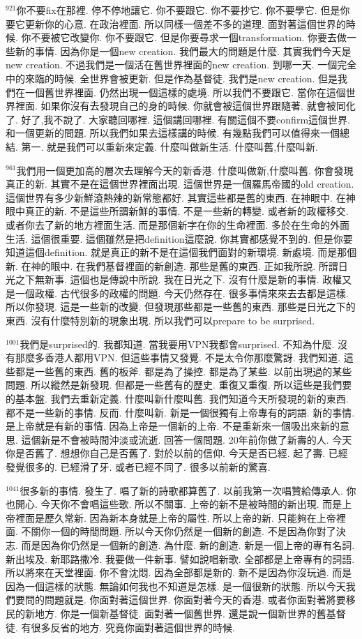 \documentclass{book}
\begin{document}
$^{921}$你不要fix在那裡.
停不停地讓它.
你不要跟它.
你不要抄它.
你不要學它.
但是你要它更新你的心意.
在政治裡面.
所以同樣一個差不多的道理.
面對著這個世界的時候.
你不要被它改變你.
你不要跟它.
但是你要尋求一個transformation.
你要去做一些新的事情.
因為你是一個new creation.
我們最大的問題是什麼.
其實我們今天是new creation.
不過我們是一個活在舊世界裡面的new creation.
到哪一天.
一個完全中的來臨的時候.
全世界會被更新.
但是作為基督徒.
我們是new creation.
但是我們在一個舊世界裡面.
仍然出現一個這樣的處境.
所以我們不要跟它.
當你在這個世界裡面.
如果你沒有去發現自己的身的時候.
你就會被這個世界跟隨著.
就會被同化了.
好了,我不說了.
大家聽回哪裡.
這個講回哪裡.
有關這個不要confirm這個世界.
和一個更新的問題.
所以我們如果去這樣講的時候.
有幾點我們可以值得來一個總結.
第一.
就是我們可以重新來定義.
什麼叫做新生活.
什麼叫舊,什麼叫新.

$^{961}$我們用一個更加高的層次去理解今天的新香港.
什麼叫做新,什麼叫舊.
你會發現真正的新.
其實不是在這個世界裡面出現.
這個世界是一個羅馬帝國的old creation.
這個世界有多少新鮮滾熱辣的新常態都好.
其實這些都是舊的東西.
在神眼中.
在神眼中真正的新.
不是這些所謂新鮮的事情.
不是一些新的轉變.
或者新的政權移交.
或者你去了新的地方裡面生活.
而是那個新字在你的生命裡面.
多於在生命的外面生活.
這個很重要.
這個雖然是把definition這麼說.
你其實都感覺不到的.
但是你要知道這個definition.
就是真正的新不是在這個我們面對的新環境.
新處境.
而是那個新.
在神的眼中.
在我們基督裡面的新創造.
那些是舊的東西.
正如我所說.
所謂日光之下無新事.
這個也是傳說中所說.
我在日光之下.
沒有什麼是新的事情.
政權又是一個政權.
古代很多的政權的問題.
今天仍然存在.
很多事情來來去去都是這樣.
所以你發現.
這是一些新的改變.
但發現那些都是一些舊的東西.
那些是日光之下的東西.
沒有什麼特別新的現象出現.
所以我們可以prepare to be surprised.

$^{1001}$我們是surprised的.
我都知道.
當我要用VPN我都會surprised.
不知為什麼.
沒有那麼多香港人都用VPN.
但這些事情又發覺.
不是太令你那麼驚訝.
我們知道.
這些都是一些舊的東西.
舊的板斧.
都是為了操控.
都是為了某些.
以前出現過的某些問題.
所以縱然是新發現.
但都是一些舊有的歷史.
重復又重復.
所以這些是我們要的基本盤.
我們去重新定義.
什麼叫新什麼叫舊.
我們知道今天所發現的新的東西.
都不是一些新的事情.
反而.
什麼叫新.
新是一個很獨有上帝專有的詞語.
新的事情.
是上帝就是有新的事情.
因為上帝是一個新的上帝.
不是重新來一個吸出來新的意思.
這個新是不會被時間沖淡或流逝.
回答一個問題.
20年前你做了新壽的人.
今天你是否舊了.
想想你自己是否舊了.
對於以前的信仰.
今天是否已經.
起了壽.
已經發覺很多的.
已經滑了牙.
或者已經不同了.
很多以前新的驚喜.

$^{1041}$很多新的事情.
發生了.
唱了新的詩歌都算舊了.
以前我第一次唱贊給傳承人.
你也開心.
今天你不會唱這些歌.
所以不關事.
上帝的新不是被時間的新出現.
而是上帝裡面是歷久常新.
因為新本身就是上帝的屬性.
所以上帝的新.
只能夠在上帝裡面.
不關你一個的時間問題.
所以今天你仍然是一個新的創造.
不是因為你對了決志.
而是因為你仍然是一個新的創造.
為什麼.
新的創造.
新是一個上帝的專有名詞.
新出埃及.
新耶路撒冷.
我要做一件新事.
譬如說唱新歌.
全部都是上帝專有的詞語.
所以將來在天堂裡面.
你不會沈悶.
因為全部都是新的.
新不是因為你沒玩過.
而是因為一個這樣的狀態.
無論如何我也不知道是怎樣.
是一個很新的狀態.
所以今天我們要問的問題就是.
你面對著這個世界.
你面對著今天的香港.
或者你面對著將要移民的新地方.
你是一個新基督徒.
面對著一個舊世界.
還是說一個新世界的舊基督徒.
有很多反省的地方.
究竟你面對著這個世界的時候.
\end{document}
